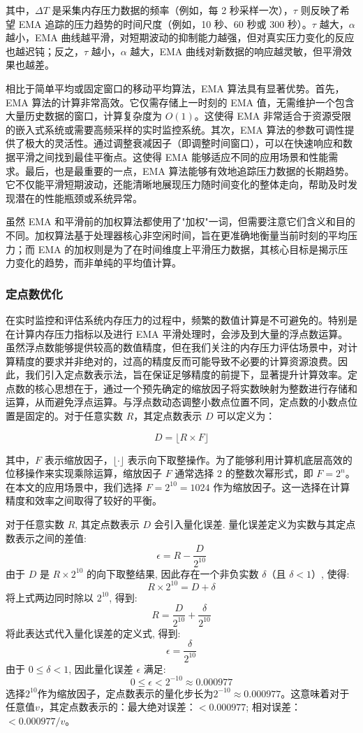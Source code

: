 其中，\(\Delta T\) 是采集内存压力数据的频率（例如，每 2 秒采样一次），\(\tau\) 则反映了希望 EMA 追踪的压力趋势的时间尺度（例如，10 秒、60 秒或 300 秒）。\(\tau\) 越大，\(\alpha\) 越小，EMA 曲线越平滑，对短期波动的抑制能力越强，但对真实压力变化的反应也越迟钝；反之，\(\tau\) 越小，\(\alpha\) 越大，EMA 曲线对新数据的响应越灵敏，但平滑效果也越差。

相比于简单平均或固定窗口的移动平均算法，EMA 算法具有显著优势。首先，EMA 算法的计算非常高效。它仅需存储上一时刻的 EMA 值，无需维护一个包含大量历史数据的窗口，计算复杂度为 \(O(1)\)。这使得 EMA 非常适合于资源受限的嵌入式系统或需要高频采样的实时监控系统。其次，EMA 算法的参数可调性提供了极大的灵活性。通过调整衰减因子（即调整时间窗口），可以在快速响应和数据平滑之间找到最佳平衡点。这使得 EMA 能够适应不同的应用场景和性能需求。最后，也是最重要的一点，EMA 算法能够有效地追踪压力数据的长期趋势。它不仅能平滑短期波动，还能清晰地展现压力随时间变化的整体走向，帮助及时发现潜在的性能瓶颈或系统异常。

虽然 EMA 和平滑前的加权算法都使用了"加权"一词，但需要注意它们含义和目的不同。加权算法基于处理器核心非空闲时间，旨在更准确地衡量当前时刻的平均压力；而 EMA 的加权则是为了在时间维度上平滑压力数据，其核心目标是揭示压力变化的趋势，而非单纯的平均值计算。

\subsubsection{定点数优化}
\label{sec:fixed_point_optimization}

在实时监控和评估系统内存压力的过程中，频繁的数值计算是不可避免的。特别是在计算内存压力指标以及进行 EMA 平滑处理时，会涉及到大量的浮点数运算。虽然浮点数能够提供较高的数值精度，但在我们关注的内存压力评估场景中，对计算精度的要求并非绝对的，过高的精度反而可能导致不必要的计算资源浪费。因此，我们引入定点数表示法，旨在保证足够精度的前提下，显著提升计算效率。定点数的核心思想在于，通过一个预先确定的缩放因子将实数映射为整数进行存储和运算，从而避免浮点运算。与浮点数动态调整小数点位置不同，定点数的小数点位置是固定的。对于任意实数 \(R\)，其定点数表示 \(D\) 可以定义为：

\[
D = \lfloor R \times F \rfloor
\]

其中，\(F\) 表示缩放因子，\(\lfloor \cdot \rfloor\) 表示向下取整操作。为了能够利用计算机底层高效的位移操作来实现乘除运算，缩放因子 \(F\) 通常选择 2 的整数次幂形式，即 \(F = 2^n\)。在本文的应用场景中，我们选择 \(F = 2^{10} = 1024\) 作为缩放因子。这一选择在计算精度和效率之间取得了较好的平衡。

对于任意实数 \(R\), 其定点数表示 \(D\) 会引入量化误差. 量化误差定义为实数与其定点数表示之间的差值:
\[
\epsilon = R - \frac{D}{2^{10}}
\]
由于 \(D\) 是 \(R \times 2^{10}\) 的向下取整结果, 因此存在一个非负实数 \(\delta\)（且 \(\delta < 1\)）, 使得:
\[
R \times 2^{10} = D + \delta
\]
将上式两边同时除以 \(2^{10}\), 得到:
\[
R = \frac{D}{2^{10}} + \frac{\delta}{2^{10}}
\]
将此表达式代入量化误差的定义式, 得到:
\[
\epsilon = \frac{\delta}{2^{10}}
\]
由于 \(0 \leq \delta < 1\), 因此量化误差 \(\epsilon\) 满足:
\[
0 \leq \epsilon < 2^{-10} \approx 0.000977
\]
选择\(2^{10}\)作为缩放因子，定点数表示的量化步长为\(2^{-10} \approx 0.000977\)。这意味着对于任意值\(v\)，其定点数表示的：最大绝对误差：\(< 0.000977\); 相对误差：\(< 0.000977/v\)。

